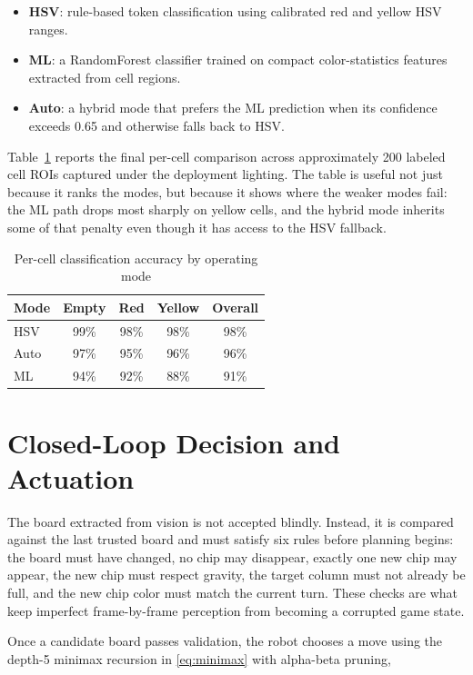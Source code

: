 \documentclass[conference]{IEEEtran}
\begin{document}
\begin{itemize}
\item \textbf{HSV}: rule-based token classification using calibrated red and yellow HSV ranges.
\item \textbf{ML}: a RandomForest classifier trained on compact color-statistics features extracted from cell regions.
\item \textbf{Auto}: a hybrid mode that prefers the ML prediction when its confidence exceeds 0.65 and otherwise falls back to HSV.
\end{itemize}

Table~\ref{tab:accuracy} reports the final per-cell comparison across approximately 200 labeled cell ROIs captured under the deployment lighting. The table is useful not just because it ranks the modes, but because it shows where the weaker modes fail: the ML path drops most sharply on yellow cells, and the hybrid mode inherits some of that penalty even though it has access to the HSV fallback.

\begin{table}[t]
\caption{Per-cell classification accuracy by operating mode}
\label{tab:accuracy}
\centering
\small
\begin{tabular}{lcccc}
\toprule
\textbf{Mode} & \textbf{Empty} & \textbf{Red} & \textbf{Yellow} & \textbf{Overall} \\
\midrule
HSV & 99\% & 98\% & 98\% & 98\% \\
Auto & 97\% & 95\% & 96\% & 96\% \\
ML & 94\% & 92\% & 88\% & 91\% \\
\bottomrule
\end{tabular}
\end{table}

\section{Closed-Loop Decision and Actuation}
The board extracted from vision is not accepted blindly. Instead, it is compared against the last trusted board and must satisfy six rules before planning begins: the board must have changed, no chip may disappear, exactly one new chip may appear, the new chip must respect gravity, the target column must not already be full, and the new chip color must match the current turn. These checks are what keep imperfect frame-by-frame perception from becoming a corrupted game state.

Once a candidate board passes validation, the robot chooses a move using the depth-5 minimax recursion in \eqref{eq:minimax} with alpha-beta pruning,
\end{document}

